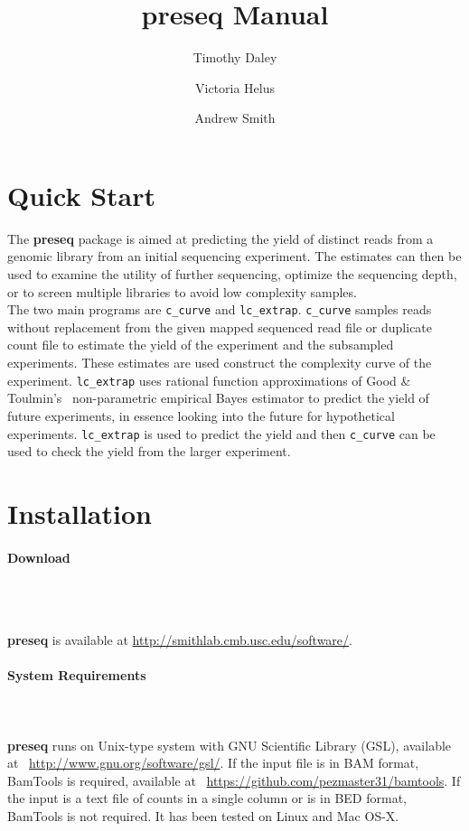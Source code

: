 \documentclass[11pt, titlepage]{article}
\title{preseq Manual}
\author{Timothy Daley \and Victoria Helus \and Andrew Smith }
\begin{document}
\maketitle



\section{Quick Start}
\label{chap:quickstart}
\newcommand{\fn}[1]{\texttt{#1}}



The \textbf{preseq} package is aimed at predicting
the yield of distinct reads from a genomic library
from an initial sequencing experiment.  The estimates
can then be used to examine the utility of further
sequencing, optimize the sequencing depth,
or to screen multiple libraries to avoid low complexity
samples.~\\[-.2cm]

\noindent The two main programs are \fn{c\_curve} and \fn{lc\_extrap}.
\fn{c\_curve} samples reads without replacement from the 
given mapped sequenced read file or duplicate count file to estimate the yield
of the experiment and the subsampled experiments.  These estimates
are used construct the complexity
curve of the experiment.  \fn{lc\_extrap} uses rational function approximations
of Good \& Toulmin's~\cite{good1956number} non-parametric
empirical Bayes estimator to predict the yield
of future experiments, in essence looking into the future
for hypothetical experiments.  \fn{lc\_extrap} is used to predict 
the yield and then \fn{c\_curve} can be used to check the yield
from the larger experiment.

\section{Installation}
\label{sec:install}

\paragraph{Download}
\label{sub:download}~\\~\\[-.2cm]
\raggedright{\textbf{preseq} is available at }
\url{http://smithlab.cmb.usc.edu/software/}.


\paragraph{System Requirements}
\label{sub:require}
~\\~\\[-.2cm]
\textbf{preseq} runs on Unix-type system
with GNU Scientific Library (GSL), available
at ~\url{http://www.gnu.org/software/gsl/}.  
If the input file is in BAM format, BamTools is
required, available at ~\url{https://github.com/pezmaster31/bamtools}.
If the input is 
a text file of counts in a single column or is 
in BED format, 
BamTools is not required.
It has been tested on Linux and 
Mac OS-X.  
\end{document}

